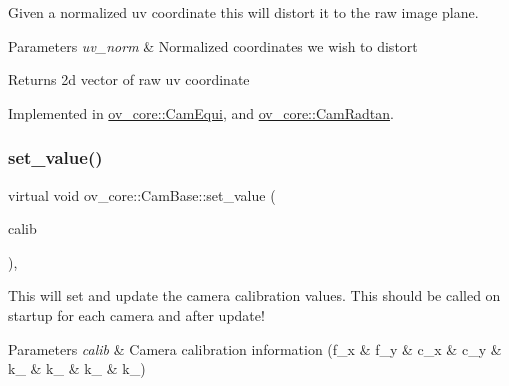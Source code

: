 Given a normalized uv coordinate this will distort it to the raw image plane. 


\begin{DoxyParams}{Parameters}
{\em uv\+\_\+norm} & Normalized coordinates we wish to distort \\
\hline
\end{DoxyParams}
\begin{DoxyReturn}{Returns}
2d vector of raw uv coordinate 
\end{DoxyReturn}


Implemented in \hyperlink{classov__core_1_1CamEqui_ac35e3814d053f66a32644321691d8e0f}{ov\+\_\+core\+::\+Cam\+Equi}, and \hyperlink{classov__core_1_1CamRadtan_a022376b5a15b827bbb7dabebc8df0508}{ov\+\_\+core\+::\+Cam\+Radtan}.

\mbox{\label{classov__core_1_1CamBase_a630f35e703c3893ae694fe0f14693216}} 
\subsubsection{\texorpdfstring{set\+\_\+value()}{set\_value()}}
{\footnotesize\ttfamily virtual void ov\+\_\+core\+::\+Cam\+Base\+::set\+\_\+value (\begin{DoxyParamCaption}\item[{const Eigen\+::\+Matrix\+Xd \&}]{calib }\end{DoxyParamCaption})\hspace{0.3cm}{\ttfamily [inline]}, {\ttfamily [virtual]}}



This will set and update the camera calibration values. This should be called on startup for each camera and after update! 


\begin{DoxyParams}{Parameters}
{\em calib} & Camera calibration information (f\+\_\+x \& f\+\_\+y \& c\+\_\+x \& c\+\_\+y \& k\+\_ \& k\+\_ \& k\+\_ \& k\+\_) \\
\hline
\end{DoxyParams}
\mbox{\label{classov__core_1_1CamBase_a42b140a7dfc1398cc7fc2f8df6c141d2}} 
